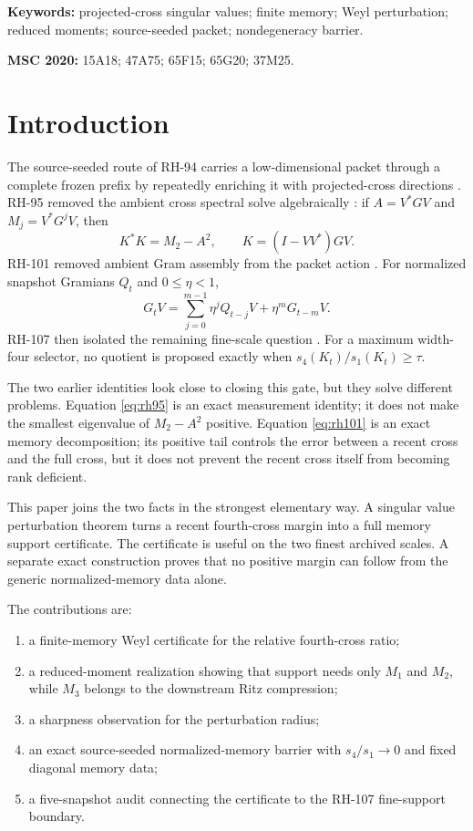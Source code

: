 \documentclass[11pt]{article}
\theoremstyle{definition}
\theoremstyle{remark}
\begin{document}
\noindent\textbf{Keywords:} projected-cross singular values; finite memory;
Weyl perturbation; reduced moments; source-seeded packet; nondegeneracy barrier.

\medskip
\noindent\textbf{MSC 2020:} 15A18; 47A75; 65F15; 65G20; 37M25.

\section{Introduction}

The source-seeded route of RH-94 carries a low-dimensional packet through a
complete frozen prefix by repeatedly enriching it with projected-cross
directions \citep{WangSourceSeeded2026}.  RH-95 removed the ambient cross
spectral solve algebraically \citep{WangReducedCross2026}:
if $A=V^*GV$ and $M_j=V^*G^jV$, then
\begin{equation}
 K^*K=M_2-A^2,
 \qquad K=(I-VV^*)GV.
 \label{eq:rh95}
\end{equation}
RH-101 removed ambient Gram assembly from the packet action
\citep{WangFiniteMemory2026}.  For
normalized snapshot Gramians $Q_t$ and $0\le\eta<1$,
\begin{equation}
 G_tV=\sum_{j=0}^{m-1}\eta^jQ_{t-j}V+\eta^mG_{t-m}V.
 \label{eq:rh101}
\end{equation}
RH-107 then isolated the remaining fine-scale question
\citep{WangSupportLaw2026}.  For a maximum
width-four selector, no quotient is proposed exactly when
$s_4(K_t)/s_1(K_t)\ge\tau$.

The two earlier identities look close to closing this gate, but they solve
different problems.  Equation \eqref{eq:rh95} is an exact measurement
identity; it does not make the smallest eigenvalue of $M_2-A^2$ positive.
Equation \eqref{eq:rh101} is an exact memory decomposition; its positive
tail controls the error between a recent cross and the full cross, but it
does not prevent the recent cross itself from becoming rank deficient.

This paper joins the two facts in the strongest elementary way.  A singular
value perturbation theorem turns a recent fourth-cross margin into a full
memory support certificate.  The certificate is useful on the two finest
archived scales.  A separate exact construction proves that no positive
margin can follow from the generic normalized-memory data alone.

The contributions are:
\begin{enumerate}[leftmargin=2.2em]
 \item a finite-memory Weyl certificate for the relative fourth-cross ratio;
 \item a reduced-moment realization showing that support needs only $M_1$
       and $M_2$, while $M_3$ belongs to the downstream Ritz compression;
 \item a sharpness observation for the perturbation radius;
 \item an exact source-seeded normalized-memory barrier with
       $s_4/s_1\to0$ and fixed diagonal memory data;
 \item a five-snapshot audit connecting the certificate to the RH-107
       fine-support boundary.
\end{enumerate}
\end{document}
